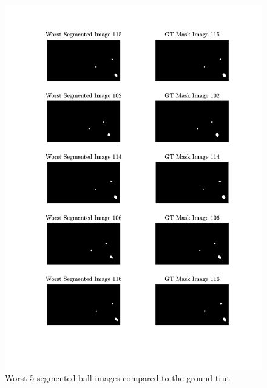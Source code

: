 \documentclass[conference]{IEEEtran}
\begin{document}
\begin{figure}[htbp]
    \centering
    \includegraphics[width=\columnwidth]{figures/worst.pdf}
    \caption{Worst 5 segmented ball images compared to the ground trut\label{apx:worst}}
\end{figure}
\end{document}
